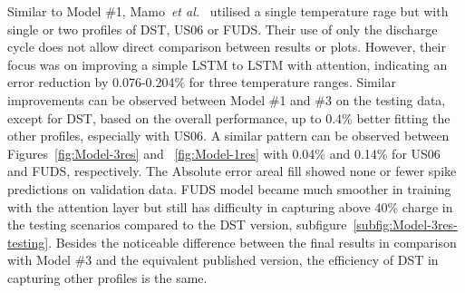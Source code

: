 %
%
Similar to Model \#1, Mamo~\textit{et al.}~\cite{mamo_long_2020} utilised a single temperature rage but with single or two profiles of DST, US06 or FUDS.
Their use of only the discharge cycle does not allow direct comparison between results or plots.
However, their focus was on improving a simple LSTM to LSTM with attention, indicating an error reduction by 0.076-0.204\% for three temperature ranges.
Similar improvements can be observed between Model \#1 and \#3 on the testing data, except for DST, based on the overall performance, up to 0.4\% better fitting the other profiles, especially with US06.
A similar pattern can be observed between Figures~\ref{fig:Model-3res} and ~\ref{fig:Model-1res} with 0.04\% and 0.14\% for US06 and FUDS, respectively.
The Absolute error areal fill showed none or fewer spike predictions on validation data.
FUDS model became much smoother in training with the attention layer but still has difficulty in capturing above 40\% charge in the testing scenarios compared to the DST version, subfigure~\ref{subfig:Model-3res-testing}. 
Besides the noticeable difference between the final results in comparison with Model \#3 and the equivalent published version, the efficiency of DST in capturing other profiles is the same.

